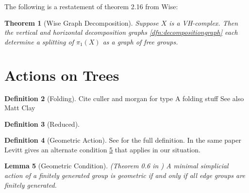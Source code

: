 \documentclass[12pt,parskip=full]{report}
\theoremstyle{plain}
\newtheorem{thm}{Theorem}[section]
\newtheorem{lem}[thm]{Lemma}
\theoremstyle{definition}
\newtheorem{dfn}[thm]{Definition}
\begin{document}
The following is a restatement of theorem 2.16 \cite{wisethesis} from Wise:
\begin{thm}[Wise Graph Decomposition]
\label{thm:wisegraph}
Suppose \(X\) is a VH-complex. Then the vertical and horizontal decomposition graphs \ref{dfn:decompositiongraph} each determine a splitting of \(\pi_1(X)\) as a graph of free groups. 
\end{thm}

\section{Actions on Trees}


\begin{dfn}
    [Folding]
    \label{defn:folding}
    Cite culler and morgan for type A folding stuff
    See also Matt Clay
\end{dfn}

\begin{dfn}
    [Reduced]
    \label{defn:reduced}
\end{dfn}

 \begin{dfn}
     [Geometric Action]
     \label{defn:geometricaction}
     See \cite{levitt} for the full definition. In the same paper Levitt gives an alternate condition \ref{lem:simpgeo} that applies in our situation.
 \end{dfn}
\begin{lem}
    [Geometric Condition]
    \label{lem:simpgeo} 
    (Theorem 0.6 in \cite{levitt})
    A minimal simplicial action of a finitely generated group is geometric if and only if all edge groups are finitely generated.
\end{lem}
\end{document}
